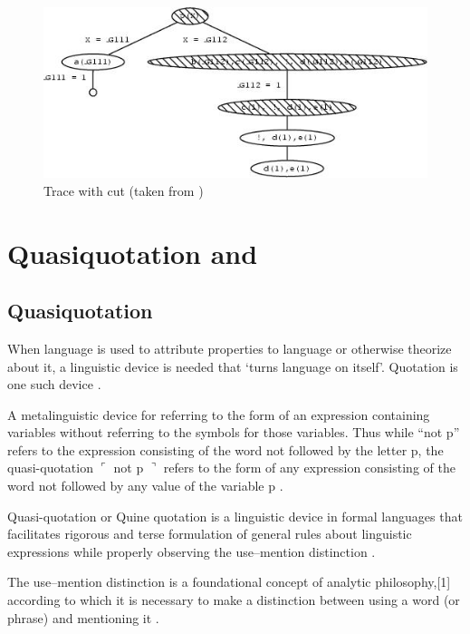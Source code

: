 \documentclass[proposal.tex]{subfiles}
\begin{document}
\begin{figure}[H]
\centering
\includegraphics[scale = .95]{prologcutrace.jpeg}
\caption{Trace with cut (taken from \cite{website:cutprologunionedu})}
\label{fig:Trace with cut}
\end{figure}



\section{Quasiquotation and }
\subsection{Quasiquotation}

When language is used to attribute properties to language or otherwise theorize about it, a linguistic device is needed that `turns 
language on itself'. Quotation is one such device \cite{website:quotationstanford}.

A metalinguistic device for referring to the form of an expression containing variables without referring to the symbols for those 
variables. Thus while ``not p'' refers to the expression consisting of the word not followed by the letter p, the quasi-quotation \newline
$\ulcorner$ not p $\urcorner$ refers to the form of any expression consisting of the word not followed by any value of the variable p 
\cite{website:quasiquotationfreedictionary}.

Quasi-quotation or Quine quotation is a linguistic device in formal languages that facilitates rigorous and terse formulation of general 
rules about linguistic expressions while properly observing the use--mention distinction \cite{wikiquasi}.

The use--mention distinction is a foundational concept of analytic philosophy,[1] according to which it is necessary to make a distinction 
between using a word (or phrase) and mentioning it \cite{website:usementiondistinctionwiki}.
\end{document}

